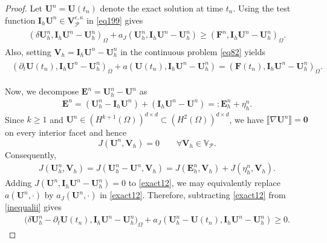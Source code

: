 \documentclass[final,12pt]{amsart}
\theoremstyle{plain}
\theoremstyle{definition}
\newcommand\calP{{\mathcal{P}}}
\newcommand\bU{\mathbf{U}}
\newcommand\bV{\mathbf{V}}
\newcommand\bE{\mathbf{E}}
\begin{document}
\begin{proof}
	Let $\mathbf{U}^n = \mathbf{U}(t_n)$ denote the exact solution at time $t_n$.
	Using the test function $\mathbf{I}_h \mathbf{U}^n\in \mathbf{V}_{\calP}^{\epsilon,\kappa}$ in \eqref{eq199} gives
	\begin{align}
		\begin{split}\label{inequalii}
			\left(\delta\mathbf{U}_h^n, \mathbf{I}_h\mathbf{U}^n - \mathbf{U}_h^n\right)_{\Omega}
			+  a_J(\mathbf{U}_h^{n}, \mathbf{I}_h\mathbf{U}^n - \mathbf{U}_h^n)
			\geq (\mathbf{F}^{n}, \mathbf{I}_h\mathbf{U}^n - \mathbf{U}_h^n)_{\Omega}.
		\end{split}
	\end{align}
	Also, setting $\mathbf{V}_h = \mathbf{I}_h \mathbf{U}^n - \mathbf{U}_h^n$ in the continuous problem \eqref{eq82} yields
	\begin{align}
		\begin{split}\label{exact12}
			\left(\partial_t\mathbf{U}(t_{n}), \mathbf{I}_h \mathbf{U}^n - \mathbf{U}_h^n\right)_{\Omega}
			+ a(\mathbf{U}(t_{n}), \mathbf{I}_h \mathbf{U}^n - \mathbf{U}_h^n)
			=(\mathbf{F}(t_{n}), \mathbf{I}_h \mathbf{U}^n - \mathbf{U}_h^n)_{\Omega}.
		\end{split}
	\end{align}

	Now, we decompose $\bE^{n}=\bU^{n}_{h}-\bU^{n}$ as
\begin{align}
	\bE^{n}=\left(\bU^{n}_{h}-\mathbf{I}_h \mathbf{U}^n\right)+\left(\mathbf{I}_{h}\bU^{n}-\bU^{n}\right)=:\bE^{n}_{h}+\eta^{n}_{h}.\label{error1}
\end{align}
Since $k\ge 1$ and $\bU^{n}\in (H^{k+1}(\Omega))^{d\times d}\subset (H^{2}(\Omega))^{d\times d}$, we have $\llbracket \nabla \bU^{n}\rrbracket=\mathbf 0$ on every interior facet and hence
\[
	J(\bU^{n},\bV_h)=0\qquad \forall \bV_h\in\mathbb V_{\calP}.
\]
Consequently,
\begin{align}
	J(\bU^{n}_{h}, \bV_{h})
	=J(\bU^{n}_{h}- \bU^{n}, \bV_{h})
	=J( \bE^{n}_{h}, \bV_{h})+J(\eta^{n}_{h}, \bV_{h}).\label{CIP12}
\end{align}
Adding $J(\bU^n,\mathbf I_h\bU^n-\bU_h^n)=0$ to \eqref{exact12}, we may equivalently replace $a(\bU^n,\cdot)$ by $a_J(\bU^n,\cdot)$ in \eqref{exact12}.
Therefore, subtracting \eqref{exact12} from \eqref{inequalii} gives
\begin{align}\label{subtraction}
	\Big(\delta\mathbf{U}_h^n - \partial_t\mathbf{U}(t_{n}), \mathbf{I}_h \mathbf{U}^n - \mathbf{U}_h^n\Big)_{\Omega}
	+ a_J(\bU_h^{n}-\bU(t_{n}), \mathbf{I}_h \mathbf{U}^n - \mathbf{U}_h^n)
	\geq 0.
\end{align}


\end{proof}
\end{document}
